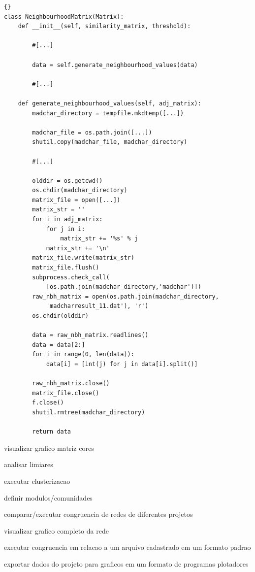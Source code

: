 \lstset{language=python}
\lstset{commentstyle=\textit}
\begin{lstlisting}[frame=trbl, caption=Geração de Matriz de Adjacências,label=lst:gennbhvalues]{}
class NeighbourhoodMatrix(Matrix):
    def __init__(self, similarity_matrix, threshold):
        
        #[...]
                    
        data = self.generate_neighbourhood_values(data)
                    
        #[...]
        
    def generate_neighbourhood_values(self, adj_matrix):
        madchar_directory = tempfile.mkdtemp([...])
        
        madchar_file = os.path.join([...])
        shutil.copy(madchar_file, madchar_directory)
        
        #[...]
        
        olddir = os.getcwd()
        os.chdir(madchar_directory)
        matrix_file = open([...])
        matrix_str = ''
        for i in adj_matrix:
            for j in i:
                matrix_str += '%s' % j
            matrix_str += '\n'
        matrix_file.write(matrix_str)
        matrix_file.flush()
        subprocess.check_call(
            [os.path.join(madchar_directory,'madchar')])
        raw_nbh_matrix = open(os.path.join(madchar_directory,
            'madcharresult_11.dat'), 'r')
        os.chdir(olddir)
        
        data = raw_nbh_matrix.readlines()
        data = data[2:]
        for i in range(0, len(data)):
            data[i] = [int(j) for j in data[i].split()]
        
        raw_nbh_matrix.close()
        matrix_file.close()
        f.close()
        shutil.rmtree(madchar_directory)
        
        return data
\end{lstlisting}

visualizar grafico matriz cores

analisar limiares

executar clusterizacao

definir modulos/comunidades

comparar/executar congruencia de redes de diferentes projetos

visualizar grafico completo da rede

executar congruencia em relacao a um arquivo cadastrado em um formato padrao

exportar dados do projeto para graficos em um formato de programas plotadores


